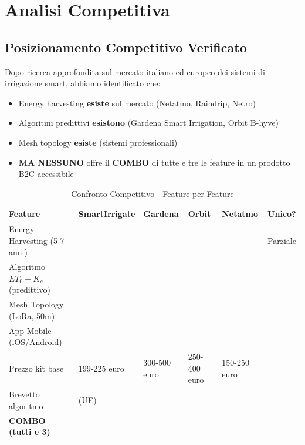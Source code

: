 \documentclass[11pt,a4paper]{report}
\newcommand{\checkmarkbold}{\textbf{\checkmark}}
\newcommand{\crossbold}{\textbf{\texttimes}}
\begin{document}
\section{Analisi Competitiva}
\subsection{Posizionamento Competitivo Verificato}
Dopo ricerca approfondita sul mercato italiano ed europeo dei sistemi di irrigazione smart, abbiamo identificato che:

\begin{itemize}
\item Energy harvesting {\bf esiste} sul mercato (Netatmo, Raindrip, Netro)
\item Algoritmi predittivi {\bf esistono} (Gardena Smart Irrigation, Orbit B-hyve)
\item Mesh topology {\bf esiste} (sistemi professionali)
\item {\bf MA NESSUNO} offre il {\bf COMBO} di tutte e tre le feature in un prodotto B2C accessibile
\end{itemize}

\begin{table}[H]
\centering
\caption{Confronto Competitivo - Feature per Feature}
\label{tab:competitive-comparison}
\begin{tabular}{L{3cm} C{1.2cm} C{1.2cm} C{1.2cm} C{1.2cm} C{1.2cm}}
\toprule
{\bf Feature} & {\bf SmartIrrigate} & {\bf Gardena} & {\bf Orbit} & {\bf Netatmo} & {\bf Unico?} \\
\midrule
Energy Harvesting (5-7 anni) & \checkmarkbold & \crossbold & \crossbold & \checkmarkbold & Parziale \\
Algoritmo $ET_0 + K_c$ (predittivo) & \checkmarkbold & \crossbold & \crossbold & \crossbold & {\bf \checkmarkbold} \\
Mesh Topology (LoRa, 50m) & \checkmarkbold & \crossbold & \crossbold & \crossbold & {\bf \checkmarkbold} \\
App Mobile (iOS/Android) & \checkmarkbold & \checkmarkbold & \checkmarkbold & \checkmarkbold & \crossbold \\
Prezzo kit base & 199-225 euro & 300-500 euro & 250-400 euro & 150-250 euro & {\bf \checkmarkbold} \\
Brevetto algoritmo & \checkmarkbold (UE) & \crossbold & \crossbold & \crossbold & {\bf \checkmarkbold} \\
\midrule
{\bf COMBO (tutti e 3)} & {\bf \checkmarkbold \checkmarkbold \checkmarkbold} & \crossbold & \crossbold & \crossbold & {\bf \checkmarkbold \checkmarkbold \checkmarkbold} \\
\bottomrule
\end{tabular}
\end{table}
\end{document}
